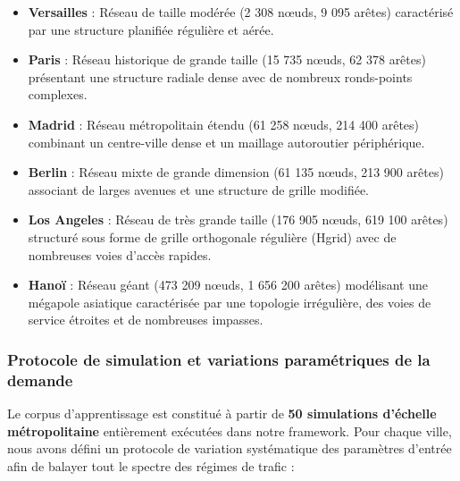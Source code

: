 \documentclass[10pt, a4paper]{article}
\providecommand{\tightlist}{}
\begin{document}
\begin{itemize}
\tightlist
\item
  \textbf{Versailles} : Réseau de taille modérée (2 308 nœuds, 9 095
  arêtes) caractérisé par une structure planifiée régulière et aérée.
\item
  \textbf{Paris} : Réseau historique de grande taille (15 735 nœuds, 62
  378 arêtes) présentant une structure radiale dense avec de nombreux
  ronds-points complexes.
\item
  \textbf{Madrid} : Réseau métropolitain étendu (61 258 nœuds, 214 400
  arêtes) combinant un centre-ville dense et un maillage autoroutier
  périphérique.
\item
  \textbf{Berlin} : Réseau mixte de grande dimension (61 135 nœuds, 213
  900 arêtes) associant de larges avenues et une structure de grille
  modifiée.
\item
  \textbf{Los Angeles} : Réseau de très grande taille (176 905 nœuds,
  619 100 arêtes) structuré sous forme de grille orthogonale régulière
  (Hgrid) avec de nombreuses voies d'accès rapides.
\item
  \textbf{Hanoï} : Réseau géant (473 209 nœuds, 1 656 200 arêtes)
  modélisant une mégapole asiatique caractérisée par une topologie
  irrégulière, des voies de service étroites et de nombreuses impasses.
\end{itemize}

\subsubsection{Protocole de simulation et variations paramétriques de la
demande}\label{protocole-de-simulation-et-variations-paramuxe9triques-de-la-demande}

Le corpus d'apprentissage est constitué à partir de \textbf{50
simulations d'échelle métropolitaine} entièrement exécutées dans notre
framework. Pour chaque ville, nous avons défini un protocole de
variation systématique des paramètres d'entrée afin de balayer tout le
spectre des régimes de trafic :
\end{document}

